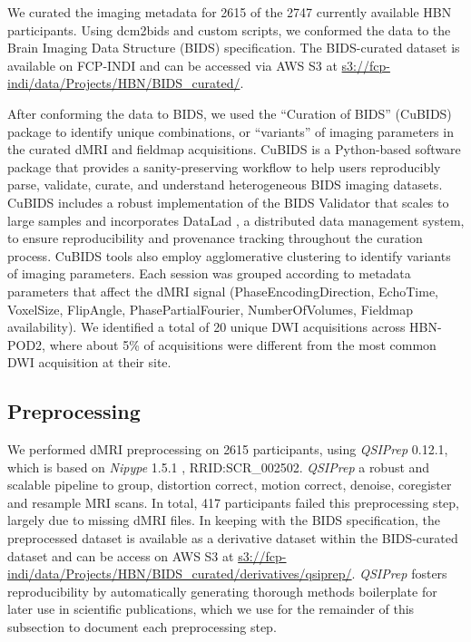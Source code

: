 \documentclass[fleqn,10pt,inline]{wlscirep}
\begin{document}
We curated the imaging metadata for \num{2615} of the \num{2747} currently
available HBN participants. Using dcm2bids and custom scripts, we conformed the data
to the Brain Imaging Data Structure (BIDS)\cite{gorgolewski2016-lh}
specification. The BIDS-curated dataset is available on FCP-INDI and can be
accessed via AWS S3 at \url{s3://fcp-indi/data/Projects/HBN/BIDS_curated/}.

After conforming the data to BIDS, we used the ``Curation of BIDS'' (CuBIDS) package \cite{sydney-covitz2022-cubids} to identify unique combinations, or ``variants'' of imaging parameters in the curated dMRI and fieldmap acquisitions.
CuBIDS is a Python-based software package that provides a sanity-preserving workflow to help users reproducibly parse, validate, curate, and understand heterogeneous BIDS imaging datasets. CuBIDS includes a robust implementation of the BIDS Validator that scales to large samples and incorporates DataLad \cite{halchenko2021datalad}, a distributed data management system, to ensure reproducibility and provenance tracking throughout the curation process. CuBIDS tools also employ agglomerative clustering to identify variants of imaging parameters.
Each session was grouped according to metadata parameters that
affect the dMRI signal (PhaseEncodingDirection, EchoTime, VoxelSize, FlipAngle, PhasePartialFourier,
NumberOfVolumes, Fieldmap availability). We identified a total of 20 unique DWI acquisitions across
HBN-POD2, where about 5\% of acquisitions were different from the most common DWI acquisition at their
site.

\subsection*{Preprocessing}

We performed dMRI preprocessing on \num{2615} participants, using \emph{QSIPrep}
\cite{cieslak2021-iq} 0.12.1, which is based on \emph{Nipype} 1.5.1
\cite{nipype1,nipype2}, RRID:SCR\_002502. \emph{QSIPrep} a robust and scalable
pipeline to group, distortion correct, motion correct, denoise, coregister and
resample MRI scans. In total, \num{417} participants failed this preprocessing
step, largely due to missing dMRI files. 
In keeping with the BIDS specification,
the preprocessed dataset is available as a derivative dataset within the
BIDS-curated dataset and can be access on AWS S3 at
\url{s3://fcp-indi/data/Projects/HBN/BIDS_curated/derivatives/qsiprep/}.
\emph{QSIPrep} fosters reproducibility by automatically generating thorough
methods boilerplate for later use in scientific publications, which we use for
the remainder of this subsection to document each preprocessing step.
\end{document}
